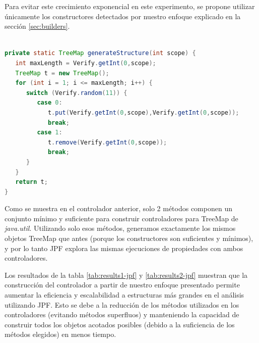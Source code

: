 
Para evitar este crecimiento exponencial en este experimento, se propone utilizar únicamente los constructores detectados por nuestro enfoque explicado en la sección \ref{sec:builders}.
\\
\\
\begin{lstlisting}[caption={Controlador con métodos constructores},label={lst:driverBLD},language=Java,captionpos=b]
private static TreeMap generateStructure(int scope) {
   int maxLength = Verify.getInt(0,scope);
   TreeMap t = new TreeMap();
   for (int i = 1; i <= maxLength; i++) {
      switch (Verify.random(11)) {
         case 0:
            t.put(Verify.getInt(0,scope),Verify.getInt(0,scope));
            break;
         case 1:
            t.remove(Verify.getInt(0,scope));
            break;						
      }
   }
   return t;
}
\end{lstlisting}

Como se muestra en el controlador anterior, solo 2 métodos componen un conjunto mínimo y suficiente para construir controladores para TreeMap de \textit{java.util}. Utilizando solo esos métodos, generamos exactamente los mismos objetos TreeMap que antes (porque los constructores son suficientes y mínimos), y por lo tanto JPF explora las mismas ejecuciones de propiedades con ambos controladores.

Los resultados de la tabla \ref{tab:results1-jpf} y \ref{tab:results2-jpf} muestran que la construcción del controlador a partir de nuestro enfoque presentado permite aumentar la eficiencia y escalabilidad a estructuras más grandes en el análisis utilizando JPF. Esto se debe a la reducción de los métodos utilizados en los controladores (evitando métodos superfluos) y manteniendo la capacidad de construir todos los objetos acotados posibles (debido a la suficiencia de los métodos elegidos) en menos tiempo.




